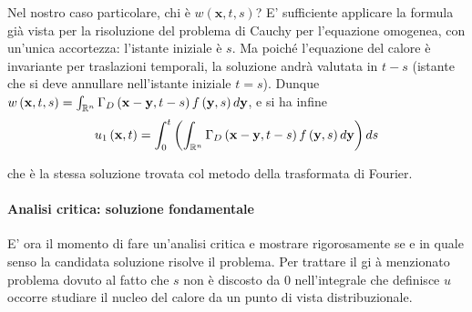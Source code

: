 \documentclass{article}
\begin{document}
Nel nostro caso particolare, chi \`{e} $w\left( \mathbf{x},t,s\right) $? E'
sufficiente applicare la formula gi\`{a} vista per la risoluzione del
problema di Cauchy per l'equazione omogenea, con un'unica accortezza:
l'istante iniziale \`{e} $s$. Ma poich\'{e} l'equazione del calore \`{e}
invariante per traslazioni temporali, la soluzione andr\`{a} valutata in $%
t-s $ (istante che si deve annullare nell'istante iniziale $t=s$). Dunque $%
w\left( \mathbf{x},t,s\right) =\int_{%
\mathbb{R}
^{n}}\Gamma _{D}\left( \mathbf{x-y},t-s\right) f\left( \mathbf{y},s\right) d%
\mathbf{y}$, e si ha infine%
\begin{equation*}
u_{1}\left( \mathbf{x},t\right) =\int_{0}^{t}\left( \int_{%
\mathbb{R}
^{n}}\Gamma _{D}\left( \mathbf{x-y},t-s\right) f\left( \mathbf{y},s\right) d%
\mathbf{y}\right) ds
\end{equation*}

che \`{e} la stessa soluzione trovata col metodo della trasformata di
Fourier.

\paragraph{Analisi critica: soluzione fondamentale}

E' ora il momento di fare un'analisi critica e mostrare rigorosamente se e
in quale senso la candidata soluzione risolve il problema. Per trattare il gi%
\`{a} menzionato problema dovuto al fatto che $s$ non \`{e} discosto da $0$
nell'integrale che definisce $u$ occorre studiare il nucleo del calore da un
punto di vista distribuzionale.
\end{document}
